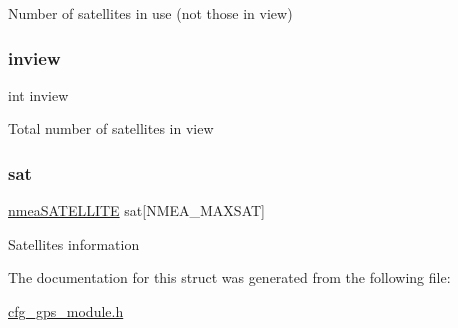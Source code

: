 Number of satellites in use (not those in view) \mbox{\label{struct__nmea_s_a_t_i_n_f_o_a39cbfb42f4909eb17b29618e11adc57e}} 
\subsubsection{\texorpdfstring{inview}{inview}}
{\footnotesize\ttfamily int inview}

Total number of satellites in view \mbox{\label{struct__nmea_s_a_t_i_n_f_o_a5b801558dc6ca3ff127f92f83ddd40b7}} 
\subsubsection{\texorpdfstring{sat}{sat}}
{\footnotesize\ttfamily \hyperlink{cfg__gps__module_8h_a7b2a7e4c7be4ebe7a590ce9239bf1e1f}{nmea\+S\+A\+T\+E\+L\+L\+I\+TE} sat\mbox{[}N\+M\+E\+A\+\_\+\+M\+A\+X\+S\+AT\mbox{]}}

Satellites information 

The documentation for this struct was generated from the following file\+:\begin{DoxyCompactItemize}
\item 
\hyperlink{cfg__gps__module_8h}{cfg\+\_\+gps\+\_\+module.\+h}\end{DoxyCompactItemize}
